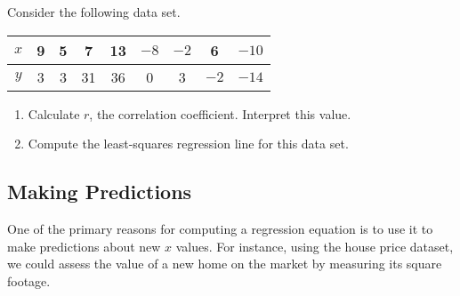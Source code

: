 \begin{try}
Consider the following data set.
\begin{center}
\begin{tabular}{c | c c c c c c c c}
$x$ & 9 & 5 & 7 & 13 & $-8$ & $-2$ & 6 & $-10$\\
\hline
$y$ & 3 & 3 & 31 & 36 & 0 & 3 & $-2$ & $-14$
\end{tabular}
\end{center}
\begin{enumerate}
\item Calculate $r$, the correlation coefficient.  Interpret this value.
\item Compute the least-squares regression line for this data set.
\end{enumerate}
\end{try}
\vfill
\pagebreak

\subsection{Making Predictions}
One of the primary reasons for computing a regression equation is to use it to make predictions about new $x$ values.  For instance, using the house price dataset, we could assess the value of a new home on the market by measuring its square footage.

